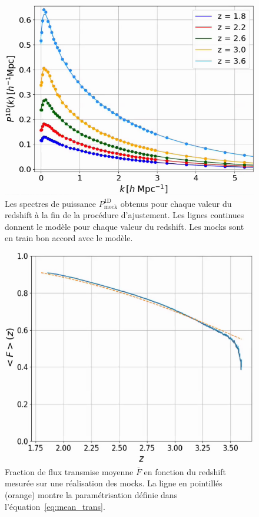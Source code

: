 \begin{figure}
  \centering
  \includegraphics[scale=0.4]{p1d_tuning}
  \caption{Les spectres de puissance $P^{\mathrm{1D}}_{\mathrm{mock}}$ obtenus pour chaque valeur du redshift à la fin de la procédure d'ajustement. Les lignes continues donnent le modèle pour chaque valeur du redshift. Les mocks sont en train bon accord avec le modèle.}
  \label{fig:p1d_tuning}
\end{figure}
\begin{figure}
  \centering
  \includegraphics[scale=0.55]{mean_trans_mock}
  \caption{Fraction de flux transmise moyenne $\overline F$ en fonction du redshift mesurée sur une réalisation des mocks. La ligne en pointillés (orange) montre la paramétrisation définie dans l'équation~\ref{eq:mean_trans}.}
  \label{fig:mean_trans_mock}
\end{figure}

